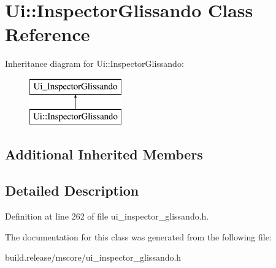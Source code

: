 \hypertarget{class_ui_1_1_inspector_glissando}{}\section{Ui\+:\+:Inspector\+Glissando Class Reference}
\label{class_ui_1_1_inspector_glissando}
Inheritance diagram for Ui\+:\+:Inspector\+Glissando\+:\begin{figure}[H]
\begin{center}
\leavevmode
\includegraphics[height=2.000000cm]{class_ui_1_1_inspector_glissando}
\end{center}
\end{figure}
\subsection*{Additional Inherited Members}


\subsection{Detailed Description}


Definition at line 262 of file ui\+\_\+inspector\+\_\+glissando.\+h.



The documentation for this class was generated from the following file\+:\begin{DoxyCompactItemize}
\item 
build.\+release/mscore/ui\+\_\+inspector\+\_\+glissando.\+h\end{DoxyCompactItemize}
